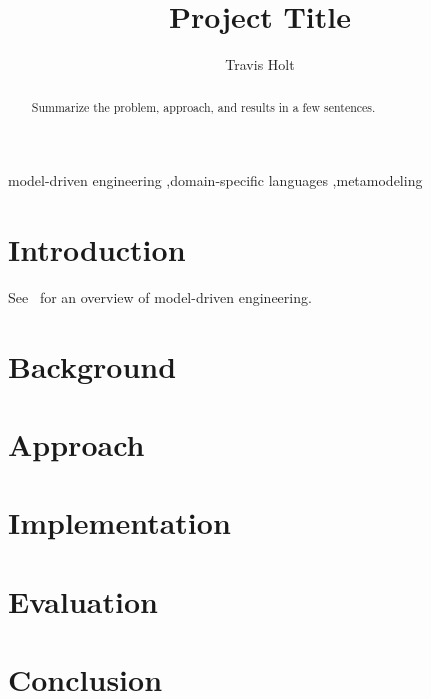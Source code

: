 \documentclass[preprint,12pt]{elsarticle}
\begin{document}
\begin{frontmatter}

\title{Project Title}

\author[udem]{Travis Holt}

\begin{abstract}
Summarize the problem, approach, and results in a few sentences.
\end{abstract}

\begin{keyword}
model-driven engineering \sep domain-specific languages \sep metamodeling
\end{keyword}

\end{frontmatter}

\section{Introduction}
\label{sec:intro}
See~\cite{brambilla2017model} for an overview of model-driven engineering.

\section{Background}
\label{sec:background}

\section{Approach}
\label{sec:approach}

\section{Implementation}
\label{sec:implementation}

\section{Evaluation}
\label{sec:evaluation}

\section{Conclusion}
\label{sec:conclusion}



\end{document}
